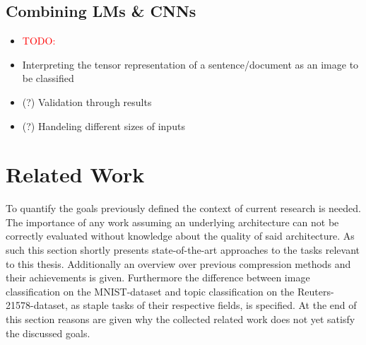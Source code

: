 \section{Combining LMs \& CNNs}
\begin{itemize}
	\item \textcolor{red}{TODO:}
	\item Interpreting the tensor representation of a sentence/document as an image to be classified
	\item (?) Validation through results
	\item (?) Handeling different sizes of inputs
\end{itemize}


\chapter{Related Work}
\label{ch:relatedwork}
To quantify the goals previously defined the context of current research is needed. The importance of any work assuming an underlying architecture can not be correctly evaluated without knowledge about the quality of said architecture. As such this section shortly presents state-of-the-art approaches to the tasks relevant to this thesis. Additionally an overview over previous compression methods and their achievements is given. Furthermore the difference between image classification on the MNIST-dataset and topic classification on the Reuters-21578-dataset, as staple tasks of their respective fields, is specified. At the end of this section reasons are given why the collected related work does not yet satisfy the discussed goals.


